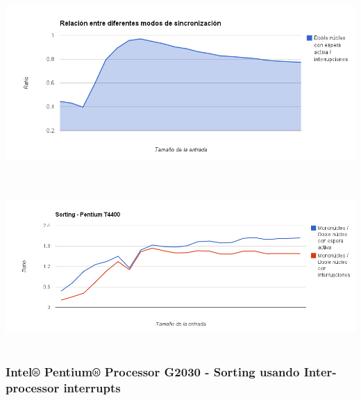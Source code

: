 	\begin{center}
	    \includegraphics[height=7cm]{images/pentium_d_mem_ipi.png}
	\end{center}

	\begin{center}
	    \includegraphics[height=6cm]{images/pentium_d_gain_mono_mem_mono_ipi.png}
	\end{center}

\subsubsection{Intel® Pentium® Processor G2030 - Sorting usando Inter-processor interrupts}

